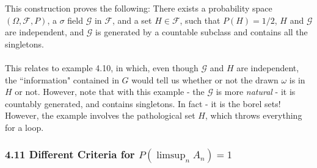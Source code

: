 \documentclass[12pt,a4paper]{article}
\newcommand{\1}[1]{\mathbbm{1}\left\{ #1 \right\}}
\newcommand{\fcal}{\mathcal{F}}
\newcommand{\gcal}{\mathcal{G}}
\begin{document}
This construction proves the following: There exists a probability space $(\Omega, \fcal, P)$, a $\sigma$ field $\gcal$ in $\fcal$, and a set $H \in \fcal$, such that $P(H) = 1/2$, $H$ and $\gcal$ are independent, and $\gcal$ is generated by a countable subclass and contains all the singletons.
\\\\
This relates to example 4.10, in which, even though $\gcal$ and $H$ are independent, the ``information" contained in $G$ would tell us whether or not the drawn $\omega$ is in $H$ or not. However, note that with this example - the $\gcal$ is more \textit{natural} - it is countably generated, and contains singletons. In fact - it is the borel sets! However, the example involves the pathological set $H$, which throws everything for a loop.

\subsubsection{4.11 Different Criteria for $P(\limsup_n A_n) = 1$}
\end{document}
